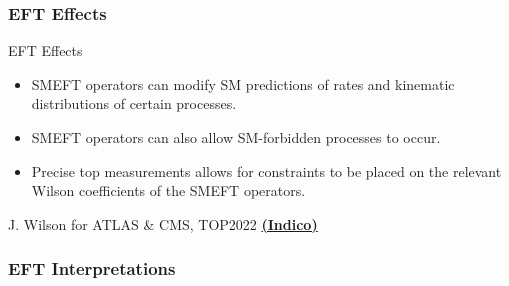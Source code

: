 \documentclass{beamer}
\begin{document}
\subsubsection{EFT Effects}

\begin{frame}{EFT Effects}
  \begin{itemize}
    \item SMEFT operators can modify SM predictions of rates and kinematic distributions of certain processes.
    \item SMEFT operators can also allow SM-forbidden processes to occur.
    \item Precise top measurements allows for constraints to be placed on the relevant Wilson coefficients of the SMEFT operators. 
  \end{itemize}
  {\tiny \color{gray} J. Wilson for ATLAS \& CMS, TOP2022 \textbf{\href{https://conference.ippp.dur.ac.uk/event/925/contributions/5716/}{(Indico)}}}
\end{frame}

\subsubsection{EFT Interpretations}
\end{document}
